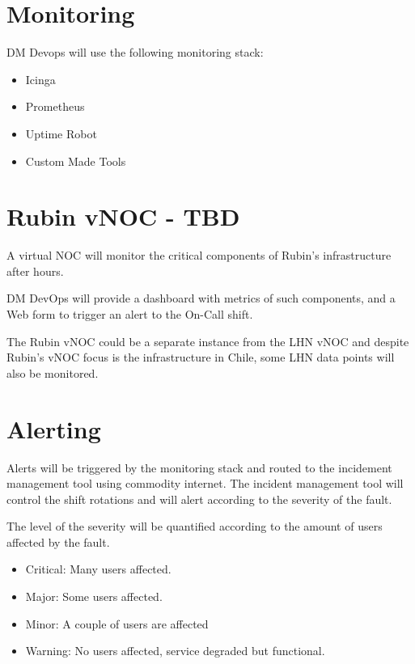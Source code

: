 \section{Monitoring}

DM Devops will use the following monitoring stack:

\begin{itemize}
    \item Icinga
    \item Prometheus
    \item Uptime Robot
    \item Custom Made Tools
\end{itemize}

\section{Rubin vNOC - TBD}

A virtual NOC will monitor the critical components of Rubin's infrastructure after hours. 

DM DevOps will provide a dashboard with metrics of such components, and a Web form to trigger an alert to the On-Call shift.  

The Rubin vNOC could be a separate instance from the LHN vNOC and despite Rubin’s vNOC focus is the infrastructure in Chile, some LHN data points will also be monitored. 


\section{Alerting}

Alerts will be triggered by the monitoring stack and routed to the incidement management tool using commodity internet. 
The incident management tool will control the shift rotations and will alert according to the severity of the fault. 

The level of the severity will be quantified according to the amount of users affected by the fault.

\begin{itemize}
    \item Critical: Many users affected. 
    \item Major: Some users affected.
    \item Minor: A couple of users are affected
    \item Warning: No users affected, service degraded but functional. 
\end{itemize}

